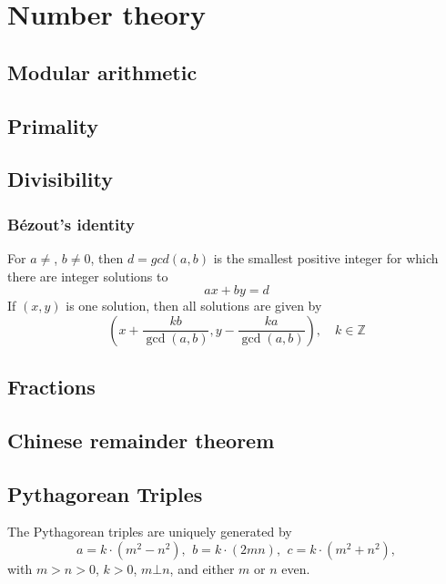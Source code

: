 \chapter{Number theory}

\section{Modular arithmetic}

\section{Primality}

\section{Divisibility}

\subsection{Bézout's identity}
For $a \neq $, $b \neq 0$, then $d=gcd(a,b)$ is the smallest positive integer for which there are integer solutions to
$$ax+by=d$$
If $(x,y)$ is one solution, then all solutions are given by
$$\left(x+\frac{kb}{\gcd(a,b)}, y-\frac{ka}{\gcd(a,b)}\right), \quad k\in\mathbb{Z}$$


\section{Fractions}

\section{Chinese remainder theorem}

\section{Pythagorean Triples}
The Pythagorean triples are uniquely generated by
\[ a=k\cdot (m^{2}-n^{2}),\ \,b=k\cdot (2mn),\ \,c=k\cdot (m^{2}+n^{2}), \]
with $m > n > 0$, $k > 0$, $m \bot n$, and either $m$ or $n$ even.

